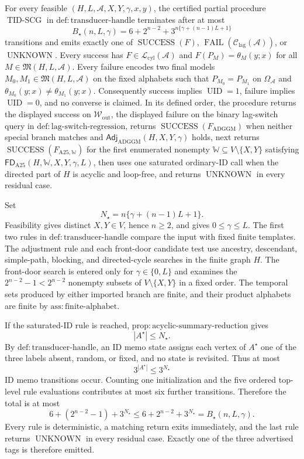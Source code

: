 For every feasible \((H,L,\mathcal A,X,Y,\gamma,x,y)\), the certified partial procedure \(\operatorname{TID\text{-}SCG}\) in \(\mathrm{def:transducer\text{-}handle}\) terminates after at most
\[
 B_\star(n,L,\gamma)=6+2^{n-2}+3^{n\{\gamma+(n-1)L+1\}}
\]
transitions and emits exactly one of \(\operatorname{SUCCESS}(F)\), \(\operatorname{FAIL}(\mathcal C_{\mathrm{lag}}(\mathcal A))\), or \(\operatorname{UNKNOWN}\).  Every success has \(F\in\mathcal L_{\mathrm{cyl}}(\mathcal A)\) and \(F(P_M)=\theta_M(y;x)\) for all \(M\in\mathfrak M(H,L,\mathcal A)\).  Every failure encodes two final models \(M_0,M_1\in\mathfrak M(H,L,\mathcal A)\) on the fixed alphabets such that \(P_{M_0}=P_{M_1}\) on \(\Omega_{\mathcal A}\) and \(\theta_{M_0}(y;x)\ne\theta_{M_1}(y;x)\).  Consequently success implies \(\operatorname{UID}=1\), failure implies \(\operatorname{UID}=0\), and no converse is claimed.  In its defined order, the procedure returns the displayed success on \(\mathcal W_{\mathrm{out}}\), the displayed failure on the binary lag-switch query in \(\mathrm{def:lag\text{-}switch\text{-}regression}\), returns \(\operatorname{SUCCESS}(F_{\mathrm{ADGGM}})\) when neither special branch matches and \(\mathsf{Adj}_{\mathrm{ADGGM}}(H,X,Y,\gamma)\) holds, next returns \(\operatorname{SUCCESS}(F_{\mathrm{A25},\mathbb W})\) for the first enumerated nonempty \(\mathbb W\subseteq V\setminus\{X,Y\}\) satisfying \(\mathsf{FD}_{\mathrm{A25}}(H,\mathbb W,X,Y,\gamma,L)\), then uses one saturated ordinary-ID call when the directed part of \(H\) is acyclic and loop-free, and returns \(\operatorname{UNKNOWN}\) in every residual case.

Set
\[
 N_\star=n\{\gamma+(n-1)L+1\}.
\]
Feasibility gives distinct \(X,Y\in V\), hence \(n\geq2\), and gives \(0\leq\gamma\leq L\).  The first two rules in \(\mathrm{def:transducer\text{-}handle}\) compare the input with fixed finite templates.  The adjustment rule and each front-door candidate test use ancestry, descendant, simple-path, blocking, and directed-cycle searches in the finite graph \(H\).  The front-door search is entered only for \(\gamma\in\{0,L\}\) and examines the \(2^{n-2}-1<2^{n-2}\) nonempty subsets of \(V\setminus\{X,Y\}\) in a fixed order.  The temporal sets produced by either imported branch are finite, and their product alphabets are finite by \(\mathrm{ass:finite\text{-}alphabet}\).

If the saturated-ID rule is reached, \(\mathrm{prop:acyclic\text{-}summary\text{-}reduction}\) gives
\[
 |A^\star|\leq N_\star.
\]
By \(\mathrm{def:transducer\text{-}handle}\), an ID memo state assigns each vertex of \(A^\star\) one of the three labels absent, random, or fixed, and no state is revisited.  Thus at most
\[
 3^{|A^\star|}\leq3^{N_\star}
\]
ID memo transitions occur.  Counting one initialization and the five ordered top-level rule evaluations contributes at most six further transitions.  Therefore the total is at most
\[
 6+(2^{n-2}-1)+3^{N_\star}
 \leq6+2^{n-2}+3^{N_\star}
 =B_\star(n,L,\gamma).
\]
Every rule is deterministic, a matching return exits immediately, and the last rule returns \(\operatorname{UNKNOWN}\) in every residual case.  Exactly one of the three advertised tags is therefore emitted.

